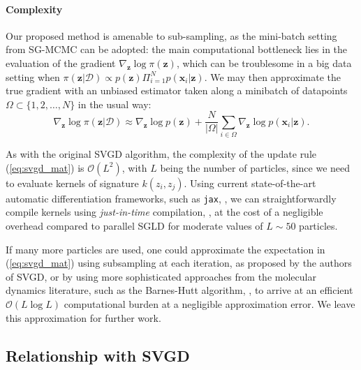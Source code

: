 \paragraph{Complexity}  Our proposed method is amenable to sub-sampling, as the mini-batch setting from SG-MCMC can be adopted: the main computational bottleneck lies in the evaluation of the gradient $\nabla_{\bm{z}} \log \pi( \bm{z})$, which can be troublesome in a big data setting when $\pi(\bm{z} | \mathcal{D}) \propto p(\bm{z}) \Pi_{i=1}^N p(\bm{x}_i | \bm{z})  $. We may then  approximate the true gradient with an unbiased estimator taken along a minibatch of datapoints $\Omega \subset \lbrace 1, 2, \ldots, N \rbrace$ in the usual way:
$$
\nabla_{\bm{z}} \log \pi( \bm{z} | \mathcal{D}) \approx \nabla_{\bm{z}} \log p(\bm{z}) + \frac{N}{| \Omega |} \sum_{i \in \Omega} \nabla_{\bm{z}} \log p(\bm{x}_i | \bm{z}).
$$




As with the original SVGD algorithm, the complexity of the update rule (\ref{eq:svgd_mat}) is $\mathcal{O}(L^2)$, with $L$ being the number of particles, since we need to evaluate kernels of signature $k(z_i, z_j)$. Using current state-of-the-art automatic differentiation frameworks, such as \texttt{jax}, \cite{jax2018github}, we can straightforwardly compile kernels using \emph{just-in-time} compilation, \cite{frostig2018compiling}, at the cost of a negligible overhead compared to parallel SGLD for moderate values of $L \sim 50$ particles.

If many more particles are  used, one could approximate the expectation in (\ref{eq:svgd_mat}) using subsampling at each iteration, as proposed by the authors of SVGD, or by using more sophisticated approaches from the molecular dynamics literature, such as the Barnes-Hutt algorithm, \cite{barnes1986hierarchical}, to arrive at an efficient $\mathcal{O}(L \log L)$ computational burden at a negligible approximation error. We leave this approximation for further work.


\subsection{Relationship with SVGD}\label{sec:relationship}

